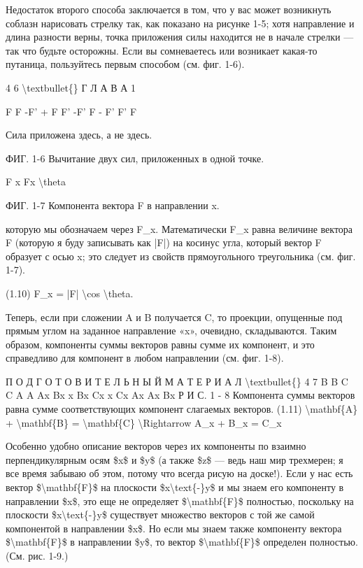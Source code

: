 \documentclass[10pt,oneside]{article}
\begin{document}
Недостаток второго способа заключается в том, что у вас может возникнуть соблазн нарисовать стрелку так, как показано на рисунке 1-5; хотя направление и длина разности верны, точка приложения силы находится не в начале стрелки --- так что будьте осторожны. Если вы сомневаетесь или возникает какая-то путаница, пользуйтесь первым способом (см. фиг. 1-6).\par

4 6 \textbackslash{}textbullet\{\} Г Л А В А  1\par

F F -F' + F F' -F' F - F' F' F\par

Сила приложена здесь, а не здесь.\par

ФИГ. 1-6 Вычитание двух сил, приложенных в одной точке.\par

F x Fx \textbackslash{}theta\par

ФИГ. 1-7 Компонента вектора F в направлении x.\par

которую мы обозначаем через F\_x. Математически F\_x равна величине вектора F (которую я буду записывать как |F|) на косинус угла, который вектор F образует с осью x; это следует из свойств прямоугольного треугольника (см. фиг. 1-7).\par

(1.10) F\_x = |F| \textbackslash{}cos \textbackslash{}theta.\par

Теперь, если при сложении A и B получается C, то проекции, опущенные под прямым углом на заданное направление «x», очевидно, складываются. Таким образом, компоненты суммы векторов равны сумме их компонент, и это справедливо для компонент в любом направлении (см. фиг. 1-8).\par

П О Д Г О Т О В И Т Е Л Ь Н Ы Й   М А Т Е Р И А Л \textbackslash{}textbullet\{\} 4 7 B B C C A A Ax Bx x Bx Cx x Cx Ax Ax Bx Р И С. 1 - 8 Компонента суммы векторов равна сумме соответствующих компонент слагаемых векторов. (1.11) \textbackslash{}mathbf\{A\} + \textbackslash{}mathbf\{B\} = \textbackslash{}mathbf\{C\} \textbackslash{}Rightarrow A\_x + B\_x = C\_x\par

Особенно удобно описание векторов через их компоненты по взаимно перпендикулярным осям \$x\$ и \$y\$ (а также \$z\$ --- ведь наш мир трехмерен; я все время забываю об этом, потому что всегда рисую на доске!). Если у нас есть вектор \$\textbackslash{}mathbf\{F\}\$ на плоскости \$x\textbackslash{}text\{-\}y\$ и мы знаем его компоненту в направлении \$x\$, это еще не определяет \$\textbackslash{}mathbf\{F\}\$ полностью, поскольку на плоскости \$x\textbackslash{}text\{-\}y\$ существует множество векторов с той же самой компонентой в направлении \$x\$. Но если мы знаем также компоненту вектора \$\textbackslash{}mathbf\{F\}\$ в направлении \$y\$, то вектор \$\textbackslash{}mathbf\{F\}\$ определен полностью. (См. рис. 1-9.)\par
\end{document}
